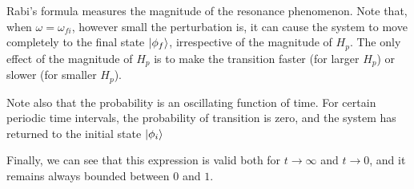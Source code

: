 Rabi's formula measures the magnitude of the resonance phenomenon. Note that, when $\omega=\omega_{fi}$, however small the perturbation is, it can cause the system to move completely to the final state $\ket{\phi_f}$, irrespective of the magnitude of $H_p$. The only effect of the magnitude of $H_p$ is to make the transition faster (for larger $H_p$) or slower (for smaller $H_p$).

Note also that the probability is an oscillating function of time. For certain periodic time intervals, the probability of transition is zero, and the system has returned to the initial state $\ket{\phi_i}$

Finally, we can see that this expression is valid both for $t\to \infty$ and $t\to 0$, and it remains always bounded between $0$ and $1$.